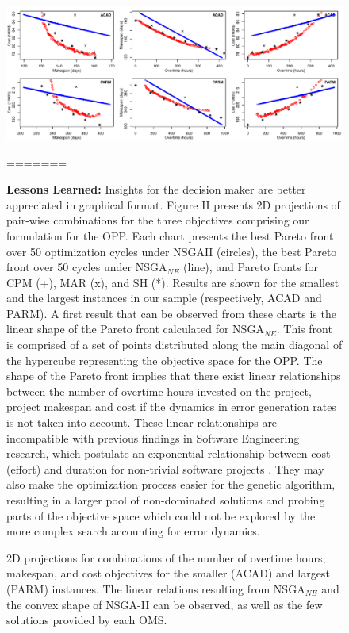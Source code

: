\documentclass[conference]{IEEEtran}
\begin{document}
\begin{figure}
\centering
\includegraphics[scale=0.65]{2dplots.pdf}
\caption{2D projections for combinations of the number of overtime hours, makespan, and cost objectives for the smaller (ACAD) and largest (PARM) instances. The linear relations resulting from NSGA$_{NE}$ and the convex shape of NSGA-II can be observed, as well as the few solutions provided by each OMS.}
=======

\textbf{Lessons Learned:} Insights for the decision maker are better appreciated in graphical format. Figure II presents 2D projections of pair-wise combinations for the three objectives comprising our formulation for the OPP. Each chart presents the best Pareto front over 50 optimization cycles under NSGAII (circles), the best Pareto front over 50 cycles under NSGA$_{NE}$ (line), and Pareto fronts for CPM (+), MAR (x), and SH (*). Results are shown for the smallest and the largest instances in our sample (respectively, ACAD and PARM).
A first result that can be observed from these charts is the linear shape of the Pareto front calculated for NSGA$_{NE}$. This front is comprised of a set of points distributed along the main diagonal of the hypercube representing the objective space for the OPP. The shape of the Pareto front implies that there exist linear relationships between the number of overtime hours invested on the project, project makespan and cost if the dynamics in error generation rates is not taken into account. These linear relationships are incompatible with previous findings in Software Engineering research, which postulate an exponential relationship between cost (effort) and duration for non-trivial software projects \cite{Boehm:1981}. They may also make the optimization process easier for the genetic algorithm, resulting in a larger pool of non-dominated solutions and probing parts of the objective space which could not be explored by the more complex search accounting for error dynamics.


\end{figure}
\end{document}
